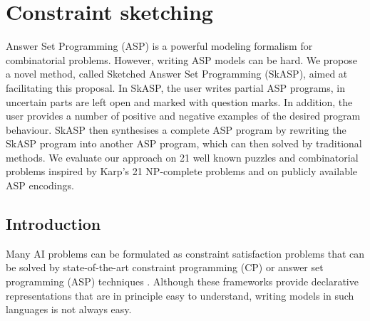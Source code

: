 \chapter{Constraint sketching} \label{ch:sketching}
Answer Set Programming (ASP) is a powerful modeling formalism for combinatorial problems. However, writing ASP models can be hard. We propose a novel method, called Sketched Answer Set Programming (SkASP), aimed at facilitating this proposal. In SkASP, the user writes partial ASP programs, in uncertain parts are left open and marked with question marks. In addition, the user provides a number of positive and negative examples of the desired program behaviour. SkASP then synthesises a complete ASP program by rewriting the SkASP program into another ASP program, which can then solved by traditional methods. We evaluate our approach on 21 well known puzzles and combinatorial problems inspired by Karp’s 21 NP-complete problems and on publicly available ASP encodings.

\newcommand{\addedsket}[1]{#1\xspace}

\section{Introduction}\label{sec:intro}
Many AI problems can be formulated as constraint satisfaction problems that can
be solved by state-of-the-art constraint programming (CP)  \parencite{handbookcp} or answer set programming (ASP) techniques \parencite{whatisasp}. 
Although these frameworks provide declarative representations that are in principle
easy to understand, writing models in such languages is not always easy.

